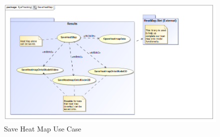 	\begin{figure}[!ht]
		\centering
		\includegraphics[scale=0.5,width=15cm,keepaspectratio]{Diagrams/Use_Case_Diagram__SaveHeatMap.png}\newline
		\caption{Save Heat Map Use Case}
	\end{figure}		
		
	

